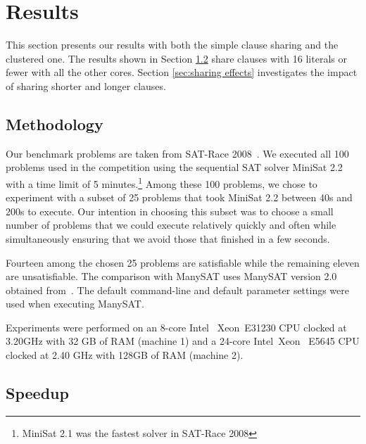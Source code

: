 \documentclass[letterpaper, compsoc, conference]{IEEEtran}
\begin{document}
\section{Results}
\label{sec:results}

This section presents our results with both the simple clause sharing and 
the clustered one. The results shown in Section \ref{sec:speedup}
share clauses with 16 literals or fewer with all the other cores. Section
\ref{sec:sharing effects} investigates the impact of sharing shorter
and longer clauses.

\subsection{Methodology}
Our benchmark problems are taken from SAT-Race 2008~\cite{SATRace2008}. We
executed all 100 problems used in the competition using the sequential SAT
solver MiniSat 2.2 with a time limit of 5 minutes.\footnote{MiniSat 2.1 was the
fastest solver in SAT-Race 2008} Among these 100 problems, we chose to
experiment with a subset of 25 problems that took MiniSat 2.2 between 40s and
200s to execute. Our intention in choosing this subset was to choose a small
number of problems that we could execute relatively quickly and often while
simultaneously ensuring that we avoid those that finished in a few seconds.

Fourteen among the chosen 25 problems are satisfiable while the remaining
eleven are unsatisfiable. The comparison with ManySAT uses ManySAT version 2.0
obtained from~\cite{ManySATWeb}.  The default command-line and default
parameter settings were used when executing ManySAT.


Experiments were performed on an 8-core Intel\textregistered
~Xeon\textregistered ~E31230 CPU clocked at 3.20GHz with 32 GB of RAM (machine 1)
and a 24-core Intel\textregistered~Xeon ~E5645 CPU clocked at 2.40 GHz with
128GB of RAM (machine 2). 

\subsection{Speedup}
\label{sec:speedup}
\end{document}
